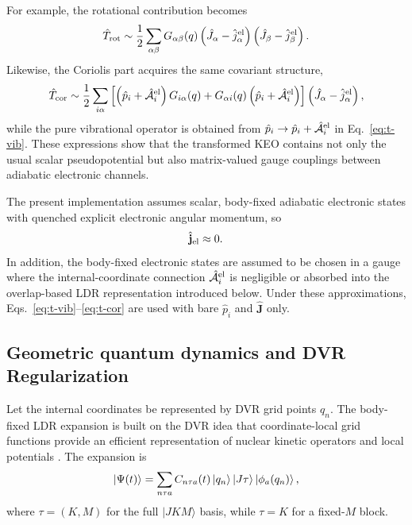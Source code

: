 \documentclass[11pt]{revtex4-2}
\begin{document}
For example, the rotational contribution becomes
\begin{equation}
  \hat{T}_{\rm rot}
  \sim
  \frac{1}{2}
  \sum_{\alpha\beta}
  G_{\alpha\beta}(q)
  \left(
    \hat{J}_\alpha - \hat{j}^{\rm el}_\alpha
  \right)
  \left(
    \hat{J}_\beta - \hat{j}^{\rm el}_\beta
  \right).
\end{equation}
Likewise, the Coriolis part acquires the same covariant structure,
\begin{equation}
  \hat{T}_{\rm cor}
  \sim
  \frac{1}{2}
  \sum_{i\alpha}
  \left[
    \left(\hat{p}_i + \hat{\mathcal A}^{\rm el}_i\right) G_{i\alpha}(q)
    +
    G_{\alpha i}(q)\left(\hat{p}_i + \hat{\mathcal A}^{\rm el}_i\right)
  \right]
  \left(
    \hat{J}_\alpha - \hat{j}^{\rm el}_\alpha
  \right),
\end{equation}
while the pure vibrational operator is obtained from
$\hat{p}_i \rightarrow \hat{p}_i + \hat{\mathcal A}^{\rm el}_i$ in
Eq.~\eqref{eq:t-vib}.  These expressions show that the transformed KEO
contains not only the usual scalar pseudopotential but also matrix-valued
gauge couplings between adiabatic electronic channels.

The present implementation assumes scalar, body-fixed adiabatic electronic
states with quenched explicit electronic angular momentum, so
\begin{equation}
  \hat{\mathbf{j}}_{\rm el} \approx 0.
\end{equation}
In addition, the body-fixed electronic states are assumed to be chosen in a
gauge where the internal-coordinate connection
$\hat{\mathcal A}^{\rm el}_i$ is
negligible or absorbed into the overlap-based LDR representation introduced
below.  Under these approximations,
Eqs.~\eqref{eq:t-vib}--\eqref{eq:t-cor} are used with bare
$\hat{p}_i$ and $\hat{\mathbf{J}}$ only.

\subsection{Geometric quantum dynamics and  DVR Regularization}

Let the internal coordinates be represented by DVR grid points $q_n$.  The
body-fixed LDR expansion is built on the DVR idea that coordinate-local
grid functions provide an efficient representation of nuclear kinetic
operators and local potentials \cite{lightcarrington2000}.  The expansion is
\begin{equation}
  \ket{\Psi(t)}
  =
  \sum_{n \tau a}
  C_{n\tau a}(t)
  \ket{q_n}
  \ket{J\tau}
  \ket{\phi_a(q_n)} ,
  \label{eq:ldr-expansion}
\end{equation}
where
$ \tau = (K,M) $
for the full $|J K M\rangle$ basis, while
$
  \tau = K
$
for a fixed-$M$ block.
\end{document}
